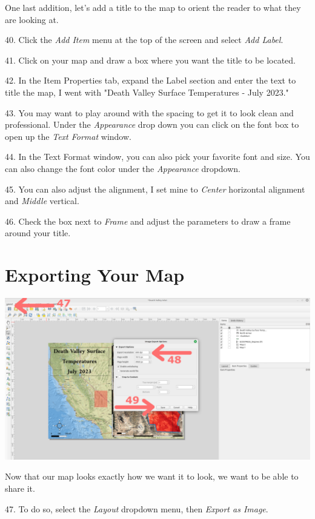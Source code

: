 \documentclass[oneside,a4paper,11pt,explicit]{book}
\begin{document}
One last addition, let's add a title to the map to orient the reader to what they are looking at. 

40. Click the \textit{Add Item} menu at the top of the screen and select \textit{Add Label}.

41. Click on your map and draw a box where you want the title to be located. 

42. In the Item Properties tab, expand the Label section and enter the text to title the map, I went with "Death Valley Surface Temperatures - July 2023." 

43. You may want to play around with the spacing to get it to look clean and professional. Under the \textit{Appearance} drop down you can click on the font box to open up the \textit{Text Format} window. 

44. In the {Text Format} window, you can also pick your favorite font and size. You can also change the font color under the \textit{Appearance} dropdown.

45.  You can also adjust the alignment, I set mine to \textit{Center} horizontal alignment and \textit{Middle} vertical.

46. Check the box next to \textit{Frame} and adjust the parameters to draw a frame around your title.

\section{Exporting Your Map}

\centerline{\includegraphics[width=\textwidth]{Export.png}}

Now that our map looks exactly how we want it to look, we want to be able to share it.

47. To do so, select the \textit{Layout} dropdown menu, then \textit{Export as Image}. 
\end{document}
